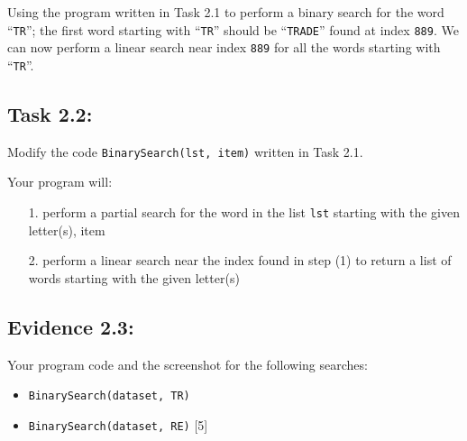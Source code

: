 Using the program written in Task 2.1 to perform a binary search for
the word \textquotedblleft \texttt{TR}\textquotedblright ; the first
word starting with \textquotedblleft \texttt{TR}\textquotedblright{}
should be \textquotedblleft \texttt{TRADE}\textquotedblright{} found
at index \texttt{889}. We can now perform a linear search near index
\texttt{889} for all the words starting with \textquotedblleft \texttt{TR}\textquotedblright . 

\subsection*{Task 2.2: }

Modify the code \texttt{BinarySearch(lst, item)} written in Task 2.1. 

Your program will: 
\begin{enumerate}
\item[1.]  perform a partial search for the word in the list \texttt{lst} starting
with the given letter(s), item 
\item[2.]  perform a linear search near the index found in step (1) to return
a list of words starting with the given letter(s) 
\end{enumerate}

\subsection*{Evidence 2.3: }

Your program code and the screenshot for the following searches: 
\begin{itemize}
\item \texttt{BinarySearch(dataset, \textquotedbl TR\textquotedbl )} 
\item \texttt{BinarySearch(dataset, \textquotedbl RE\textquotedbl )}\hfill{}
{[}5{]}
\end{itemize}